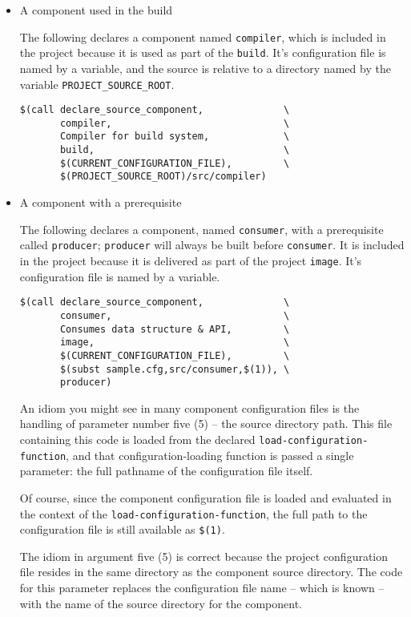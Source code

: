 \begin{itemize}
\item A component used in the build

The following declares a component named \texttt{compiler}, which is
included in the project because it is used as part of the
\texttt{build}.  It's configuration file is named by a \make variable,
and the source is relative to a directory named by the variable
\texttt{PROJECT\_SOURCE\_ROOT}.

\begin{verbatim}
$(call declare_source_component,              \
       compiler,                              \
       Compiler for build system,             \
       build,                                 \
       $(CURRENT_CONFIGURATION_FILE),         \
       $(PROJECT_SOURCE_ROOT)/src/compiler)
\end{verbatim}

\item A component with a prerequisite

The following declares a component, named \texttt{consumer}, with a
prerequisite called \texttt{producer}; \texttt{producer} will always
be built before \texttt{consumer}.  It is included in the project
because it is delivered as part of the project \texttt{image}.  It's
configuration file is named by a \make variable.

\begin{verbatim}
$(call declare_source_component,              \
       consumer,                              \
       Consumes data structure & API,         \
       image,                                 \
       $(CURRENT_CONFIGURATION_FILE),         \
       $(subst sample.cfg,src/consumer,$(1)), \
       producer)
\end{verbatim}

An idiom you might see in many component configuration files is the
handling of parameter number five (5) -- the source directory path.
This file containing this code is loaded from the declared
\texttt{load-configuration-function}, and that configuration-loading
function is passed a single parameter: the full pathname of the
configuration file itself.

Of course, since the component configuration file is loaded and
evaluated in the context of the \texttt{load-configuration-function},
the full path to the configuration file is still available as
\texttt{\$(1)}.

The idiom in argument five (5) is correct because the project
configuration file resides in the same directory as the component
source directory.  The code for this parameter replaces the
configuration file name -- which is known -- with the name of the
source directory for the component.

\end{itemize}


